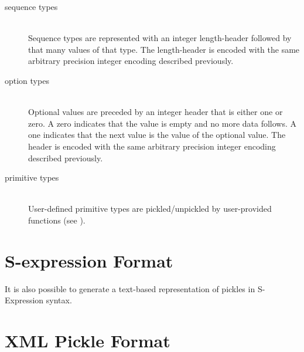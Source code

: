 \begin{description}
  \item[sequence types] \mbox{}\\
    Sequence types are represented with an integer length-header followed by
    that many values of that type.
    The length-header is encoded with the same arbitrary precision integer encoding
    described previously.

  \item[option types] \mbox{}\\
    Optional values are preceded by an integer header that is either one or zero.
    A zero indicates that the value is empty and no more data follows.
    A one indicates that the next value is the value of the optional value.
    The header is encoded with the same arbitrary precision integer encoding described previously.

  \item[primitive types] \mbox{}\\
    User-defined primitive types are pickled/unpickled by user-provided functions (see
    ).
\end{description}%

\section{S-expression Format}
It is also possible to generate a text-based representation of pickles in S-Expression
syntax.


\section{XML Pickle Format}

